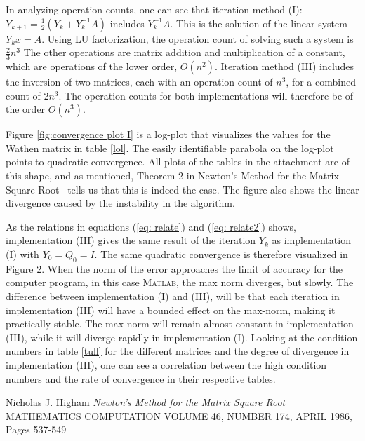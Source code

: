 In analyzing operation counts, one can see that iteration method (I): $Y_{k+1}=\frac{1}{2}(Y_{k}+Y_{k}^{-1}A)$ includes $Y_{k}^{-1}A$. This is the solution of the linear system $Y_{k}x=A$. Using LU factorization, the operation count of solving such a system is $\frac{2}{3}n^{3}$ The other operations are matrix addition and multiplication of a constant, which are operations of the lower order, $O(n^{2})$. Iteration method (III) includes the inversion of two matrices, each with an operation count of $n^{3}$, for a combined count of $2n^{3}$. The operation counts for both implementations will therefore be of the order $O(n^3)$.

Figure \ref{fig:convergence plot I} is a log-plot that visualizes the values for the Wathen matrix in table \ref{lol}. The easily identifiable parabola on the log-plot points to quadratic convergence. All plots of the tables in the attachment are of this shape, and as mentioned, Theorem 2 in Newton's Method for the Matrix Square Root~\cite{paper} tells us that this is indeed the case. The figure also shows the linear divergence caused by the instability in the algorithm. 

As the relations in equations (\ref{eq: relate}) and (\ref{eq: relate2})  shows, implementation (III) gives the same result of the iteration  $Y_k$ as implementation (I) with $Y_{0}=Q_{0}=I$. The same quadratic convergence is therefore visualized in Figure 2. When the norm of the error approaches the limit of accuracy for the computer program, in this case \textsc{Matlab}, the max norm diverges, but slowly. The difference between implementation (I) and (III), will be that each iteration in implementation (III) will have a bounded effect on the max-norm, making it practically stable. The max-norm will remain almost constant in implementation (III), while it will diverge rapidly in implementation (I). Looking at the condition numbers in table \ref{tull} for the different matrices and the degree of divergence in implementation (III), one can see a correlation between the high condition numbers and the rate of convergence in their respective tables.


\begin{thebibliography}{00}
 Nicholas J. Higham \textit{Newton's Method for the Matrix Square Root} MATHEMATICS COMPUTATION VOLUME 46, NUMBER 174, APRIL 1986, Pages 537-549
\end{thebibliography}

